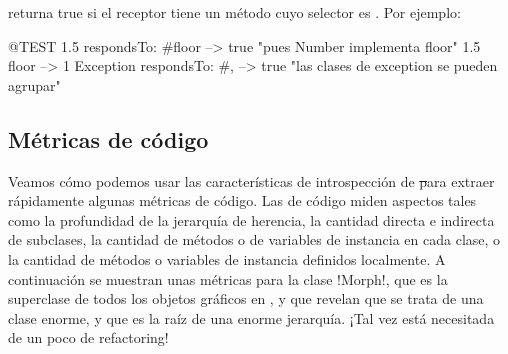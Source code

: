 \documentclass[a4paper,10pt,twoside]{book}
\begin{document}
 returna true si el receptor tiene un
método cuyo selector es .
Por ejemplo:
\begin{code}{@TEST}
1.5 respondsTo: #floor      --> true    "pues Number implementa floor"
1.5 floor                            --> 1
Exception respondsTo: #, --> true    "las clases de exception se pueden agrupar"
\end{code}



\subsection{Métricas de código}

Veamos cómo podemos usar las características de introspección de \st
para extraer rápidamente algunas métricas de código.  Las
 de código miden aspectos tales como la profundidad de
la jerarquía de herencia, la cantidad directa e indirecta de
subclases, la cantidad de métodos o de variables de instancia en cada
clase, o la cantidad de métodos o variables de instancia definidos
localmente.  A continuación se muestran unas métricas para la clase
\ct!Morph!, que es la superclase de todos los objetos gráficos en
\pharo, y que revelan que se trata de una clase enorme, y que es la
raíz de una enorme jerarquía. ¡Tal vez está necesitada de un poco de
refactoring!
\end{document}
